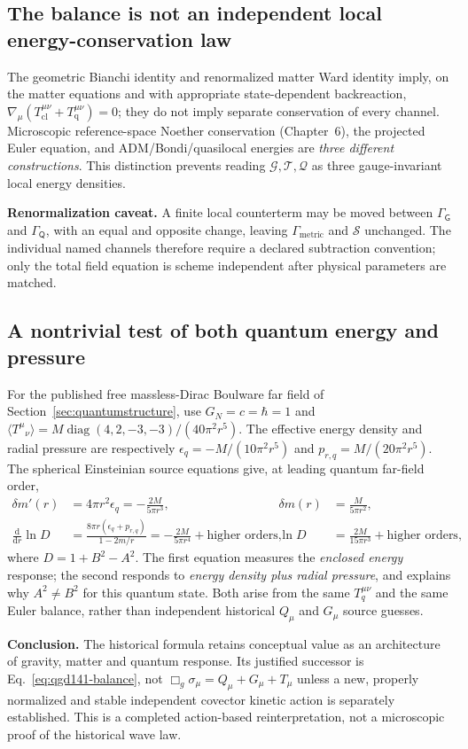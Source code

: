 \documentclass[11pt,a4paper]{article}
\newcommand{\dd}{\mathrm d}
\begin{document}
\subsection{The balance is not an independent local energy-conservation law}
The geometric Bianchi identity and renormalized matter Ward identity
imply, on the matter equations and with appropriate state-dependent
backreaction, $\nabla_\mu(T_{\mathrm{cl}}^{\mu\nu}
+T_{\mathrm{q}}^{\mu\nu})=0$; they do not imply separate
conservation of every channel. Microscopic reference-space Noether
conservation (Chapter~6), the projected Euler equation, and
ADM/Bondi/quasilocal energies are \emph{three different constructions}.
This distinction prevents reading $\mathscr G,\mathscr T,\mathscr Q$
as three gauge-invariant local energy densities.

\textbf{Renormalization caveat.} A finite local counterterm may be
moved between $\Gamma_{\mathsf G}$ and $\Gamma_{\mathsf Q}$,
with an equal and opposite change, leaving $\Gamma_{\mathrm{metric}}$
and $\mathscr S$ unchanged. The individual named channels therefore
require a declared subtraction convention; only the total field
equation is scheme independent after physical parameters are matched.

\subsection{A nontrivial test of both quantum energy and pressure}
For the published free massless-Dirac Boulware far field of
Section~\ref{sec:quantumstructure}, use $G_N=c=\hbar=1$ and
$\langle T^\mu{}_{\nu}\rangle=M\operatorname{diag}(4,2,-3,-3)/(40\pi^2r^5)$.
The effective energy density and radial pressure are respectively
$\epsilon_q=-M/(10\pi^2r^5)$ and
$p_{r,q}=M/(20\pi^2r^5)$.
The spherical Einsteinian source equations give, at leading quantum
far-field order,
\begin{equation}\label{eq:qgd141-radial}
\boxed{\begin{aligned}
\delta m'(r)&=4\pi r^2\epsilon_q=-\frac{2M}{5\pi r^3},
&\delta m(r)&=\frac{M}{5\pi r^2},\\
\frac{\dd}{\dd r}\ln D
&=\frac{8\pi r(\epsilon_q+p_{r,q})}{1-2m/r}
=-\frac{2M}{5\pi r^4}+\text{higher orders},
&\ln D&=\frac{2M}{15\pi r^3}+\text{higher orders},
\end{aligned}}
\end{equation}
where $D=1+B^2-A^2$. The first equation measures the
\emph{enclosed energy} response; the second responds to
\emph{energy density plus radial pressure}, and explains why
$A^2\ne B^2$ for this quantum state. Both arise from the same
$T_q^{\mu\nu}$ and the same Euler balance, rather than independent
historical $Q_\mu$ and $G_\mu$ source guesses.

\textbf{Conclusion.} The historical formula retains conceptual
value as an architecture of gravity, matter and quantum response.
Its justified successor is Eq.~\eqref{eq:qgd141-balance},
not $\Box_g\sigma_\mu=Q_\mu+G_\mu+T_\mu$ unless a new,
properly normalized and stable independent covector kinetic action
is separately established. This is a completed action-based
reinterpretation, not a microscopic proof of the historical wave law.


\clearpage
\end{document}
